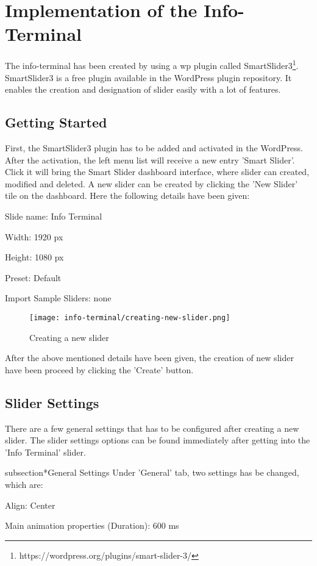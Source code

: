 \chapter{Implementation of the Info-Terminal}
The info-terminal has been created by using a \ac{wp} plugin called SmartSlider3\footnote{https://wordpress.org/plugins/smart-slider-3/}. SmartSlider3 is a free plugin available in the WordPress plugin repository. It enables the creation and designation of slider easily with a lot of features.

\section{Getting Started}
First, the SmartSlider3 plugin has to be added and activated in the WordPress. After the activation, the left menu list will receive a new entry 'Smart Slider'. Click it will bring the Smart Slider dashboard interface, where slider can created, modified and deleted. A new slider can be created by clicking the 'New Slider' tile on the dashboard. Here the following details have been given:
\begin{itemize*}
\item Slide name: Info Terminal
\item Width: 1920 px
\item Height: 1080 px
\item Preset: Default
\item Import Sample Sliders: none
\end{itemize*}
\begin{figure}[ht]
\caption{Creating a new slider}
\label{creating-a-new-slider}
\centering
\texttt{[image: info-terminal/creating-new-slider.png]}
\end{figure}

After the above mentioned details have been given, the creation of new slider have been proceed by clicking the 'Create' button.

\section{Slider Settings}
There are a few general settings that has to be configured after creating a new slider. The slider settings options can be found immediately after getting into the 'Info Terminal' slider.

subsection*{General Settings}
Under 'General' tab, two settings has be changed, which are:
\begin{itemize*}
\item Align: Center
\item Main animation properties (Duration): 600 ms
\end{itemize*}

